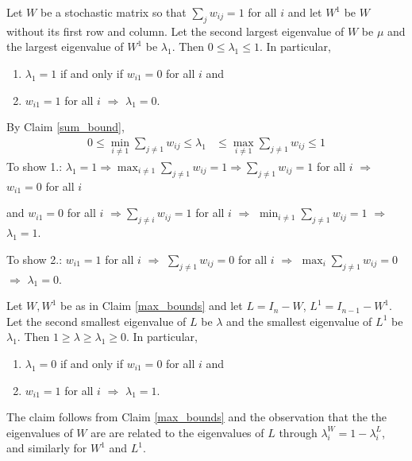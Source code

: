 \documentclass{article}
\begin{document}
\begin{claim} \label{max_bounds}
Let $W$ be a stochastic matrix so that $\sum_jw_{ij}=1$ for all $i$ and let $W^1$ be $W$ without its first row and column.  Let the second largest eigenvalue of $W$ be $\mu$ and the largest eigenvalue of $W^1$ be $\lambda_1$.  Then $0\leq \lambda_1\leq 1$.  In particular,
\begin{enumerate}
\item $\lambda_1=1$ if and only if $w_{i1}=0$ for all $i$ and
\item $w_{i1}=1$ for all $i$ $\Rightarrow$ $\lambda_1=0$.
\end{enumerate}
\end{claim}

\begin{pf}
By Claim \ref{sum_bound}, 
\begin{align*}
0\leq \min_{i\neq 1}\sum_{j\neq 1} w_{ij}\leq \lambda_1&\leq \max_{i\neq 1}\sum_{j\neq 1}w_{ij}\leq 1
\end{align*}
To show 1.: $\lambda_1=1 \Rightarrow \max_{i\neq 1}\sum_{j\neq 1}w_{ij}=1 \Rightarrow \sum_{j\neq 1}w_{ij}=1$ for all $i$ $\Rightarrow$ $w_{i1}=0$ for all $i$

and $w_{i1}=0$ for all $i$ $\Rightarrow \sum_{j\neq i}w_{ij}=1$ for all $i$ $\Rightarrow$ $\min_{i\neq 1}\sum_{j\neq 1}w_{ij}=1$ $\Rightarrow$ $\lambda_1=1$.

To show 2.: $w_{i1}=1$ for all $i$ $\Rightarrow$ $\sum_{j\neq 1}w_{ij}=0$ for all $i$ $\Rightarrow $ $\max_i\sum_{j\neq 1}w_{ij}=0$ $\Rightarrow $ $\lambda_1=0$.
\end{pf}

\begin{claim} \label{myconjecture}
Let $W,W^1$ be as in Claim \ref{max_bounds} and let $L=I_n-W$, $L^1=I_{n-1}-W^1$.  Let the second smallest eigenvalue of $L$ be $\lambda$ and the smallest eigenvalue of $L^1$ be $\lambda_1$.  Then $1\geq \lambda\geq \lambda_1\geq 0$.  In particular,
\begin{enumerate}
\item $\lambda_1=0$ if and only if $w_{i1}=0$ for all $i$ and
\item $w_{i1}=1$ for all $i$ $\Rightarrow$ $\lambda_1=1$.
\end{enumerate}
\end{claim}

\begin{pf}
The claim follows from Claim \ref{max_bounds} and the observation that the the eigenvalues of $W$ are are related to the eigenvalues of $L$ through $\lambda^W_i=1-\lambda^L_i$, and similarly for $W^1$ and $L^1$.
\end{pf}
\end{document}
